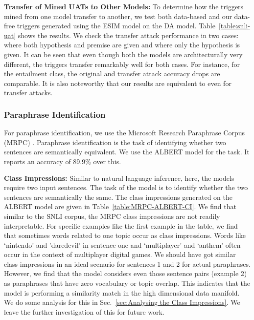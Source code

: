 





\textbf{Transfer of Mined UATs to Other Models:} To determine how the triggers mined from one model transfer to another, we test both data-based and our data-free triggers generated using the ESIM model on the DA model. Table~\ref{table:snli-uat} shows the results. We check the transfer attack performance in two cases: where both hypothesis and premise are given and where only the hypothesis is given. It can be seen that even though both the models are architecturally very different, the triggers transfer remarkably well for both cases. For instance, for the entailment class, the original and transfer attack accuracy drops are comparable. It is also noteworthy that our results are equivalent to \cite{wallace2019universal} even for transfer attacks.





\subsubsection{Paraphrase Identification}
\label{sec:Paraphrase Identification}
For paraphrase identification, we use the Microsoft Research Paraphrase Corpus (MRPC) \cite{dolan2005automatically}. Paraphrase identification is the task of identifying whether two sentences are semantically equivalent. We use the ALBERT model \cite{lan2019albert} for the task. It reports an accuracy of 89.9\% over this.

\noindent \textbf{Class Impressions:} Similar to natural language inference, here, the models require two input sentences. The task of the model is to identify whether the two sentences are semantically the same. The class impressions generated on the ALBERT model are given in Table~\ref{table:MRPC-ALBERT-CI}. We find that similar to the SNLI corpus, the MRPC class impressions are not readily interpretable. For specific examples like the first example in the table, we find that sometimes words related to one topic occur as class impressions. Words like `nintendo' and 'daredevil' in sentence one and `multiplayer' and `anthem' often occur in the context of multiplayer digital games. We should have got similar class impressions in an ideal scenario for sentences 1 and 2 for actual paraphrases. However, we find that the model considers even those sentence pairs (example 2) as paraphrases that have zero vocabulary or topic overlap. This indicates that the model is performing a similarity match in the high dimensional data manifold. We do some analysis for this in Sec.~\ref{sec:Analysing the Class Impressions}. We leave the further investigation of this for future work.

